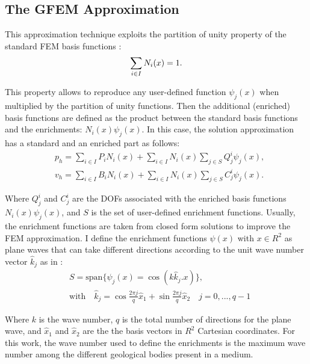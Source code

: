 \subsection{The GFEM Approximation}
This approximation technique exploits the partition of unity property of the standard FEM basis functions \cite{BABUSKA1997}:
 \begin{equation} \label{Eq2.6}
  \sum_{i \in I}  N_i(x)=1.\\
 \end{equation}

This property allows to reproduce any user-defined function $\psi_j(x)$ when multiplied by the partition of unity functions. Then the additional (enriched) basis functions are defined as the product between the standard basis functions and the enrichments:  $N_i(x) \psi_j(x)$. In this case, the solution approximation has a standard and an enriched part as follows:
 \begin{equation} \label{Eq2.7}
 \begin{split}
   & p_h=\sum_{i \in I} P_i N_i(x)  + \sum_{i \in I} N_i(x)  \sum_{j \in S} Q_j^i \psi_j(x)    , \\
   & v_h=\sum_{i \in I}B_i N_i(x)  +  \sum_{i \in I} N_i(x) \sum_{j \in S} C_j^i \psi_j(x)  .
 \end{split}
 \end{equation}

Where $Q_j^i$ and $C_j^i$  are the DOFs associated with the enriched basis functions $N_i(x) \psi_j(x)$, and $S$ is the set of user-defined enrichment functions. Usually, the enrichment functions are taken from closed form solutions to improve the FEM approximation. I define the enrichment functions $\psi  (x)$ with $x \in R^2$ as plane waves that can take different directions according to the unit wave number vector $\hat {k}_j$ as in \cite{Strouboulis2006}:
 \begin{equation} \label{Eq2.8}
 \begin{split}
   & S= \text{span}\lbrace \psi_j (x) =\cos \left(k \hat {k}_j. x \right)   \rbrace , \\
   & \text{with} \quad \hat {k}_j = \cos \frac{2 \pi j}{q} \hat {x}_1 + \sin \frac{2 \pi j}{q} \hat{x}_2 \quad j=0,...,q-1
 \end{split}
 \end{equation}
 
Where $k$ is the wave number, $q$ is the total number of directions for the plane wave, and $ \hat{x}_1$ and $\hat{x}_2$ are the the basis vectors in $R^2$ Cartesian coordinates.
For this work, the wave number used to define the enrichments is the maximum wave number  among the different geological bodies  present in a medium.

